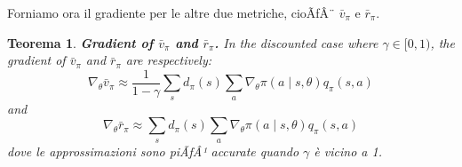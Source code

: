 ﻿\documentclass[11pt, a4paper]{report}
\newtheorem{theorem}{Teorema}
\begin{document}
Forniamo ora il gradiente per le altre due metriche, cioÃƒÂ¨ $\bar{v}_{\pi}$ e $\bar{r}_{\pi}$.

\begin{theorem}
\textbf{Gradient of $\bar{v}_{\pi}$ and $\bar{r}_{\pi}$.} In the discounted case where $\gamma \in [0, 1)$, the gradient of $\bar{v}_{\pi}$ and $\bar{r}_{\pi}$ are respectively:
\begin{equation}
\nabla_{\theta} \bar{v}_{\pi} \approx \frac{1}{1 - \gamma} \sum_s d_{\pi}(s) \sum_a \nabla_{\theta} \pi(a \mid s, \theta) q_{\pi}(s, a)
\end{equation}
and
\begin{equation}
\nabla_{\theta} \bar{r}_{\pi} \approx \sum_s d_{\pi}(s) \sum_a \nabla_{\theta} \pi(a \mid s, \theta) q_{\pi}(s, a)
\end{equation}
dove le approssimazioni sono piÃƒÂ¹ accurate quando $\gamma$ è vicino a 1.
\end{theorem}
\end{document}
